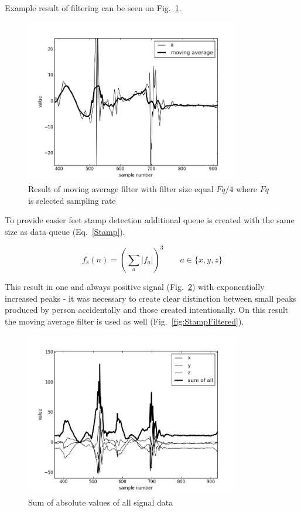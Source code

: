 \documentclass[conference]{IEEEtran}
\begin{document}
Example result of filtering can be seen on Fig.~\ref{fig:MovinAverageExample}.

\begin{figure}[!h]
    \centering
    \includegraphics[width=9.5cm]{Images/MovinAverageExample.png}
    \caption{Result of moving average filter with filter size equal $Fq/4$ where $Fq$ is selected sampling rate}
    \label{fig:MovinAverageExample}
\end{figure}

To provide easier feet stamp detection additional queue is created with the same size as data queue (Eq.~\ref{Stamp}).

\begin{equation}
    f_s(n) = \left(\sum\limits_{a} |f_a|\right)^3 \qquad a\in \{x, y, z\}
    \label{Stamp}
\end{equation}

This result in one and always positive signal (Fig.~\ref{fig:Stamp}) with exponentially increased peaks - it was necessary to create clear distinction between small peaks produced by person accidentally and those created intentionally.
On this result the moving average filter is used as well (Fig.~\ref{fig:StampFiltered}).

\begin{figure}[!h]
    \centering
    \includegraphics[width=9.5cm]{Images/Stamp.png}
    \caption{Sum of absolute values of all signal data}
    \label{fig:Stamp}
\end{figure}
\end{document}
